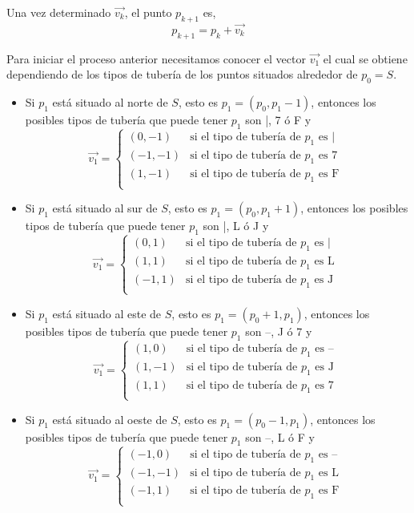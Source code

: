 \documentclass[a4paper,12pt]{article}
\begin{document}
Una vez determinado $\vec{v_k}$, el punto $p_{k+1}$ es,
$$p_{k+1} = p_k + \vec{v_k}$$

Para iniciar el proceso anterior necesitamos conocer el vector $\vec{v_1}$ el cual se obtiene dependiendo de los tipos de tubería de los puntos situados alrededor de $p_0=S$.

\begin{itemize}
    \item Si $p_1$ está situado al norte de $S$, esto es $p_1=(p_0, p_1-1)$, entonces los posibles tipos de tubería que puede tener $p_1$ son |, 7 ó F y 
    $$\vec{v_1}=\begin{cases}
        (0,-1) & \text{si el tipo de tubería de } p_1\text{ es | } \\
        (-1,-1) & \text{si el tipo de tubería de } p_1\text{ es 7 } \\
        (1,-1) & \text{si el tipo de tubería de } p_1\text{ es F } \\
    \end{cases} $$

    \item Si $p_1$ está situado al sur de $S$, esto es $p_1=(p_0, p_1+1)$, entonces los posibles tipos de tubería que puede tener $p_1$ son |, L ó J y 
    $$\vec{v_1}=\begin{cases}
        (0, 1) & \text{si el tipo de tubería de } p_1\text{ es | } \\
        (1, 1) & \text{si el tipo de tubería de } p_1\text{ es L } \\
        (-1,1) & \text{si el tipo de tubería de } p_1\text{ es J } \\
    \end{cases} $$
    
    \item Si $p_1$ está situado al este de $S$, esto es $p_1=(p_0+1, p_1)$, entonces los posibles tipos de tubería que puede tener $p_1$ son --, J ó 7 y 
    $$\vec{v_1}=\begin{cases}
        (1, 0) & \text{si el tipo de tubería de } p_1\text{ es -- } \\
        (1, -1) & \text{si el tipo de tubería de } p_1\text{ es J } \\
        (1, 1) & \text{si el tipo de tubería de } p_1\text{ es 7 } \\
    \end{cases} $$
    
    \item Si $p_1$ está situado al oeste de $S$, esto es $p_1=(p_0-1, p_1)$, entonces los posibles tipos de tubería que puede tener $p_1$ son --, L ó F y 
    $$\vec{v_1}=\begin{cases}
        (-1, 0) & \text{si el tipo de tubería de } p_1\text{ es -- } \\
        (-1, -1) & \text{si el tipo de tubería de } p_1\text{ es L } \\
        (-1, 1) & \text{si el tipo de tubería de } p_1\text{ es F } \\
    \end{cases} $$    
\end{itemize}
\end{document}
